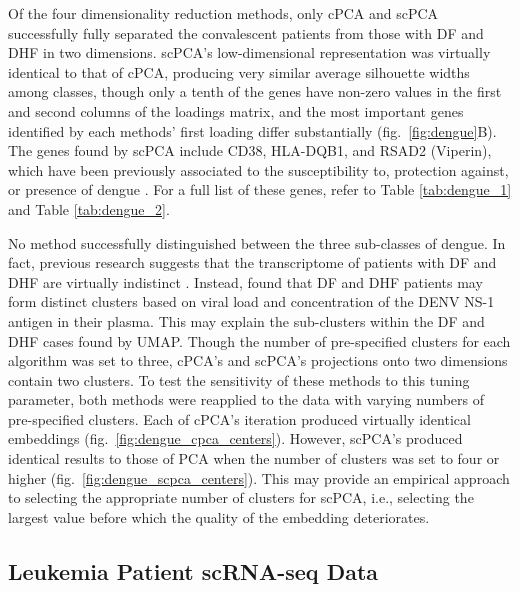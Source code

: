 Of the four dimensionality reduction methods, only cPCA and scPCA successfully fully separated the convalescent patients from those with DF and DHF in two dimensions. scPCA's low-dimensional representation was virtually identical to that of cPCA, producing very similar average silhouette widths among classes, though only a tenth of the genes have non-zero values in the first and second columns of the loadings matrix, and the most important genes identified by each methods' first loading differ substantially (fig.~\ref{fig:dengue}B). The genes found by scPCA include CD38, HLA-DQB1, and RSAD2 (Viperin), which have been previously associated to the susceptibility to, protection against, or presence of dengue \cite{Castaneda2016,Cardozo2014,Fitzgerald2011}. For a full list of these genes, refer to Table \ref{tab:dengue_1} and Table \ref{tab:dengue_2}. 

No method successfully distinguished between the three sub-classes of dengue. In fact, previous research suggests that the transcriptome of patients with DF and DHF are virtually indistinct \cite{Kwissa2014}. Instead, \citet{Kwissa2014} found that DF and DHF patients may form distinct clusters based on viral load and concentration of the DENV NS-1 antigen in their plasma. This may explain the sub-clusters within the DF and DHF cases found by UMAP. Though the number of pre-specified clusters for each algorithm was set to three, cPCA's and scPCA's projections onto two dimensions contain two clusters. To test the sensitivity of these methods to this tuning parameter, both methods were reapplied to the data with varying numbers of pre-specified clusters. Each of cPCA's iteration produced virtually identical embeddings (fig.~\ref{fig:dengue_cpca_centers}). However, scPCA's produced identical results to those of PCA when the number of clusters was set to four or higher (fig.~\ref{fig:dengue_scpca_centers}). This may provide an empirical approach to selecting the appropriate number of clusters for scPCA, i.e., selecting the largest value before which the quality of the embedding deteriorates.


\subsection{Leukemia Patient scRNA-seq Data}\label{leukemia_data}

